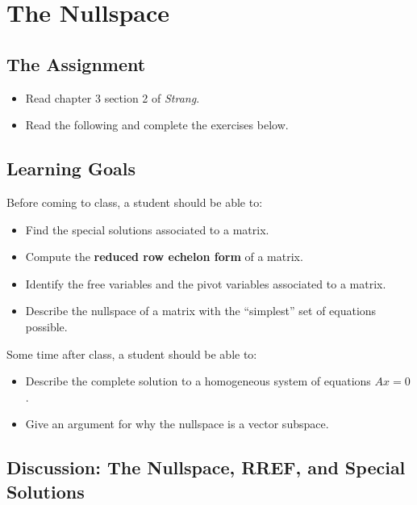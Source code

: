 \documentclass[10pt,]{book}
\newcommand{\terminology}[1]{\textbf{#1}}
\theoremstyle{plain}
\theoremstyle{definition}
\numberwithin{equation}{section}
\begin{document}
\section[The Nullspace]{The Nullspace}\label{nullspace}
\typeout{************************************************}
\typeout{************************************************}
\subsection[The Assignment]{The Assignment}\label{subsection-63}
\begin{itemize}
\item{}Read chapter 3 section 2 of \emph{Strang}.\item{}Read the following and complete the exercises below.\end{itemize}
\typeout{************************************************}
\typeout{************************************************}
\subsection[Learning Goals]{Learning Goals}\label{subsection-64}
Before coming to class, a student should be able to:%
\begin{itemize}
\item{}Find the special solutions associated to a matrix.\item{}Compute the \terminology{reduced row echelon form} of a matrix.\item{}Identify the free variables and the pivot variables associated to
        a matrix.
      \item{}
        Describe the nullspace of a matrix with the ``simplest'' set of
        equations possible.
      \end{itemize}
\par
Some time after class, a student should be able to:%
\begin{itemize}
\item{}Describe the complete solution to a homogeneous system of equations
        \(Ax = 0\).
      \item{}Give an argument for why the nullspace is a vector subspace.\end{itemize}
\typeout{************************************************}
\typeout{************************************************}
\subsection[Discussion: The Nullspace, RREF, and Special Solutions]{Discussion: The Nullspace, RREF, and Special Solutions}\label{subsection-65}
\end{document}
